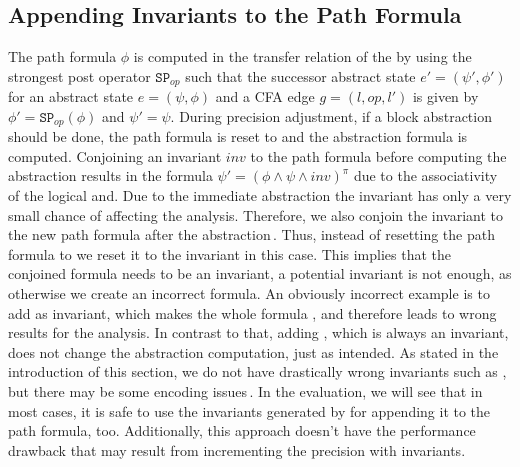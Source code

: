 \subsection{Appending Invariants to the Path Formula}
The path formula $\phi$ is computed in the transfer relation of the \PredicateCPA{} by using the strongest post operator $\mathtt{SP}_{op}$ such that the successor abstract state $e' = (\psi', 
\phi')$ for an abstract state $e = (\psi, \phi)$ and a \ac{CFA} edge $g = (l, op, l')$ is given by $\phi' = \mathtt{SP}_{op}(\phi)$ and $\psi' = \psi$. During precision adjustment, if a block 
abstraction should be done, the path formula is reset to \true{} and the abstraction formula is computed. Conjoining an invariant $inv$ to the path formula before computing the abstraction results 
in the formula $\psi' = (\phi \land \psi \land inv)^\pi$ due to the associativity of the logical and.
Due to the immediate abstraction the invariant has only a very small chance of affecting the analysis. Therefore, we also conjoin the invariant to the new path formula after the abstraction\,. Thus, instead of resetting the path formula to \true{} we reset it to the invariant in this case.
This implies that the conjoined formula needs to be an invariant, a potential invariant is not enough, as otherwise we create an incorrect formula. An obviously incorrect example is to add \false{} as 
invariant, which makes the whole formula \false{}, and therefore leads to wrong results for the analysis. In contrast to that, adding \true{}, which is always an invariant, does not change the abstraction 
computation, just as intended. As stated in the introduction of this section, we do not have drastically wrong invariants such as \false{}, but there may be some encoding issues\,. In the evaluation, we will see that in most cases, it is safe to use the invariants generated by \CPAchecker{} for 
appending it to the path formula, too. Additionally, this approach doesn't have the performance drawback that may result from incrementing the precision with invariants.


